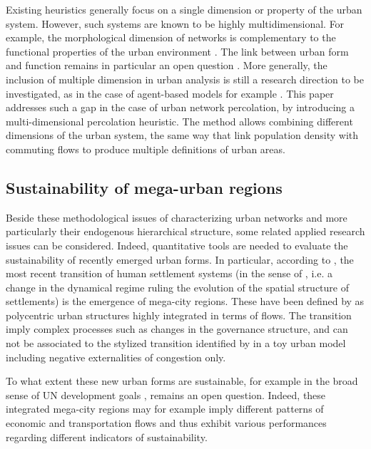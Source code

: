 \documentclass{jimis-en}
\begin{document}
Existing heuristics generally focus on a single dimension or property of the urban system. However, such systems are known to be highly multidimensional. For example, the morphological dimension of networks is complementary to the functional properties of the urban environment \citep{burger2012form}. The link between urban form and function remains in particular an open question \citep{batty1994fractal}. More generally, the inclusion of multiple dimension in urban analysis is still a research direction to be investigated, as in the case of agent-based models for example \citep{perez2016agent}. This paper addresses such a gap in the case of urban network percolation, by introducing a multi-dimensional percolation heuristic. The method allows combining different dimensions of the urban system, the same way that \cite{cottineau2018defining} link population density with commuting flows to produce multiple definitions of urban areas.


\subsection{Sustainability of mega-urban regions}


Beside these methodological issues of characterizing urban networks and more particularly their endogenous hierarchical structure, some related applied research issues can be considered. Indeed, quantitative tools are needed to evaluate the sustainability of recently emerged urban forms. In particular, according to \cite{lenechet2017peupler}, the most recent transition of human settlement systems (in the sense of \cite{sanders2017peupler}, i.e. a change in the dynamical regime ruling the evolution of the spatial structure of settlements) is the emergence of mega-city regions. These have been defined by \cite{hall2006polycentric} as polycentric urban structures highly integrated in terms of flows. The transition imply complex processes such as changes in the governance structure, and can not be associated to the stylized transition identified by \cite{louf2013modeling} in a toy urban model including negative externalities of congestion only.

To what extent these new urban forms are sustainable, for example in the broad sense of UN development goals \citep{komiyama2006sustainability}, remains an open question. Indeed, these integrated mega-city regions may for example imply different patterns of economic and transportation flows and thus exhibit various performances regarding different indicators of sustainability.
\end{document}
